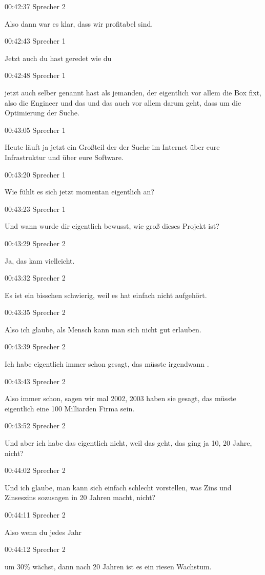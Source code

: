 00:42:37 Sprecher 2

Also dann war es klar, dass wir profitabel sind.

00:42:43 Sprecher 1

Jetzt auch du hast geredet wie du

00:42:48 Sprecher 1

jetzt auch selber genannt hast als jemanden, der eigentlich vor allem
die Box fixt, also die Engineer und das und das auch vor allem darum
geht, dass um die Optimierung der Suche.

00:43:05 Sprecher 1

Heute läuft ja jetzt ein Großteil der der Suche im Internet über eure
Infrastruktur und über eure Software.

00:43:20 Sprecher 1

Wie fühlt es sich jetzt momentan eigentlich an?

00:43:23 Sprecher 1

Und wann wurde dir eigentlich bewusst, wie groß dieses Projekt ist?

00:43:29 Sprecher 2

Ja, das kam vielleicht.

00:43:32 Sprecher 2

Es ist ein bisschen schwierig, weil es hat einfach nicht aufgehört.

00:43:35 Sprecher 2

Also ich glaube, als Mensch kann man sich nicht gut erlauben.

00:43:39 Sprecher 2

Ich habe eigentlich immer schon gesagt, das müsste irgendwann .

00:43:43 Sprecher 2

Also immer schon, sagen wir mal 2002, 2003 haben sie gesagt, das müsste
eigentlich eine 100 Milliarden Firma sein.

00:43:52 Sprecher 2

Und aber ich habe das eigentlich nicht, weil das geht, das ging ja 10,
20 Jahre, nicht?

00:44:02 Sprecher 2

Und ich glaube, man kann sich einfach schlecht vorstellen, was Zins und
Zinseszins sozusagen in 20 Jahren macht, nicht?

00:44:11 Sprecher 2

Also wenn du jedes Jahr

00:44:12 Sprecher 2

um 30\% wächst, dann nach 20 Jahren ist es ein riesen Wachstum.


